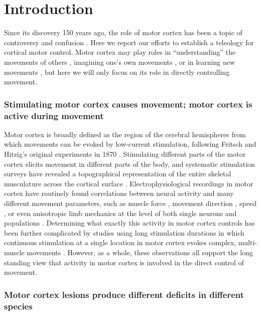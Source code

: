 \section{Introduction}

Since its discovery 150 years ago, the role of motor cortex has been a topic of controversy and confusion \cite{Tyler2000,Gross2007,Lashley1924,DeBarenne1933}. Here we report our efforts to establish a teleology for cortical motor control. Motor cortex may play roles in ``understanding'' the movements of others \cite{Rizzolatti2004}, imagining one's own movements \cite{Porro1996}, or in learning new movements \cite{Kawai2015}, but here we will only focus on its role in directly controlling movement.

\subsubsection*{Stimulating motor cortex causes movement; motor cortex is active during movement}

Motor cortex is broadly defined as the region of the cerebral hemispheres from which movements can be evoked by low-current stimulation, following Fritsch and Hitzig's original experiments in 1870 \cite{Fritsch1870}. Stimulating different parts of the motor cortex elicits movement in different parts of the body, and systematic stimulation surveys have revealed a topographical representation of the entire skeletal musculature across the cortical surface \cite{Leyton1917, Penfield1937, Neafsey1986}. Electrophysiological recordings in motor cortex have routinely found correlations between neural activity and many different movement parameters, such as muscle force \cite{Evarts1968}, movement direction \cite{Georgopoulos1986}, speed \cite{Schwartz1993}, or even anisotropic limb mechanics \cite{Scott2001} at the level of both single neurons \cite{Evarts1968,Churchland2007} and populations \cite{Georgopoulos1986,Churchland2012}. Determining what exactly this activity in motor cortex controls \cite{Todorov2000} has been further complicated by studies using long stimulation durations in which continuous stimulation at a single location in motor cortex evokes complex, multi-muscle movements \cite{Graziano2002,Aflalo2006}. However, as a whole, these observations all support the long standing view that activity in motor cortex is involved in the direct control of movement.

\subsubsection*{Motor cortex lesions produce different deficits in different species}

